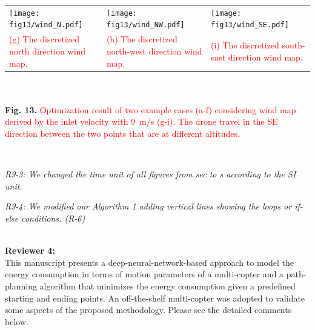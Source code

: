 \documentclass[onecolumn]{IEEEconf}
\begin{document}
\begin{description}
\begin{mdframed}[ linewidth=.75pt, userdefinedwidth=0.9\textwidth]
    \begin{tabular}{m{}m{}m{}|}
    \texttt{[image: fig13/wind\_N.pdf]}&
    \texttt{[image: fig13/wind\_NW.pdf]}&
    \texttt{[image: fig13/wind\_SE.pdf]}\\
    \small \textcolor{red}{(g) The discretized north direction wind map.} &
    \small \textcolor{red}{(h) The discretized north-west direction wind map.} &
    \small \textcolor{red}{(i) The discretized south-east direction wind map.} \\
    \end{tabular}
    ~\\
    ~\\
    \textbf{Fig. 13.} \textcolor{red}{Optimization result of two example cases (a-f) considering wind map derived by the inlet velocity with 9~m/s (g-i). 
    The drone travel in the SE direction between the two points that are at different altitudes.}
    \label{fig: wind_opt}
 \end{mdframed}       
	~\\
	\item \textit
	{
	R9-3: We changed the time unit of all figures from sec to s according to the SI unit.
    }
    ~\\
    \item \textit
	{
	R9-4: We modified our Algorithm 1 adding vertical lines showing the loops or if-else conditions. (R-6)
    }
 	~\\
    ~\\
\end{description}
\pagebreak
\textbf{\large Reviewer 4:}\\
This manuscript presents a deep-neural-network-based approach to model the energy consumption in terms of motion parameters of a multi-copter and a path-planning algorithm that minimizes the energy consumption given a predefined starting and ending points. An off-the-shelf multi-copter was adopted to validate some aspects of the proposed methodology.  Please see the detailed comments below. 
\end{document}
